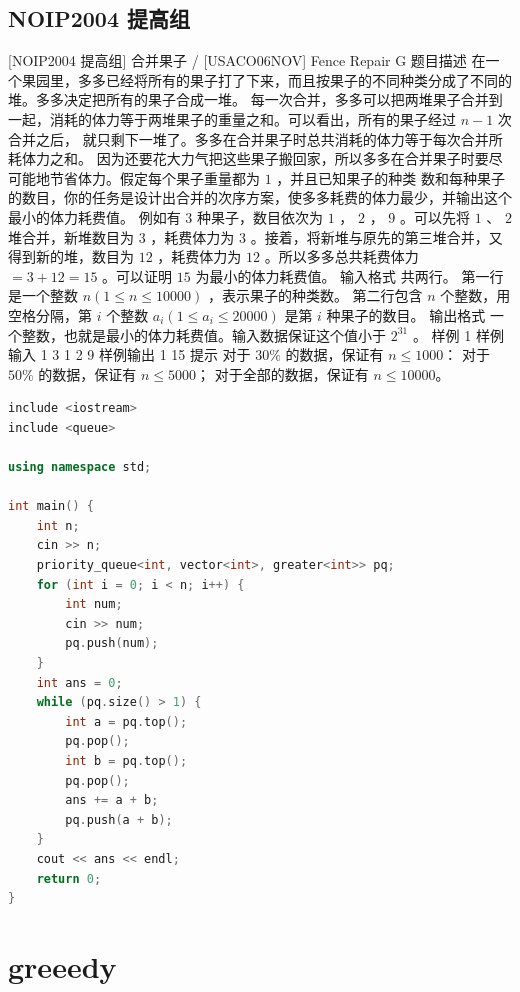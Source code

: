 \documentclass[12pt,twiside,a4paper]{ctexbook}
\numberwithin{chapter}{part}
\begin{document}
\section{NOIP2004 提高组}
 [NOIP2004 提高组] 合并果子 / [USACO06NOV] Fence Repair G
 题目描述
在一个果园里，多多已经将所有的果子打了下来，而且按果子的不同种类分成了不同的堆。多多决定把所有的果子合成一堆。
每一次合并，多多可以把两堆果子合并到一起，消耗的体力等于两堆果子的重量之和。可以看出，所有的果子经过 $n-1$ 次合并之后， 就只剩下一堆了。多多在合并果子时总共消耗的体力等于每次合并所耗体力之和。
因为还要花大力气把这些果子搬回家，所以多多在合并果子时要尽可能地节省体力。假定每个果子重量都为 $1$ ，并且已知果子的种类 数和每种果子的数目，你的任务是设计出合并的次序方案，使多多耗费的体力最少，并输出这个最小的体力耗费值。
例如有 $3$ 种果子，数目依次为 $1$ ， $2$ ， $9$ 。可以先将 $1$ 、 $2$ 堆合并，新堆数目为 $3$ ，耗费体力为 $3$ 。接着，将新堆与原先的第三堆合并，又得到新的堆，数目为 $12$ ，耗费体力为 $12$ 。所以多多总共耗费体力 $=3+12=15$ 。可以证明 $15$ 为最小的体力耗费值。
 输入格式
共两行。  
第一行是一个整数 $n(1\leq n\leq 10000)$ ，表示果子的种类数。  
第二行包含 $n$ 个整数，用空格分隔，第 $i$ 个整数 $a_i(1\leq a_i\leq 20000)$ 是第 $i$ 种果子的数目。
 输出格式
一个整数，也就是最小的体力耗费值。输入数据保证这个值小于 $2^{31}$ 。
 样例 1
 样例输入 1
3 
1 2 9
 样例输出 1
15
 提示
对于 $30\%$ 的数据，保证有 $n \le 1000$：
对于 $50\%$ 的数据，保证有 $n \le 5000$；
对于全部的数据，保证有 $n \le 10000$。
\begin{lstlisting}[language=c++,breaklines=true]
include <iostream>
include <queue>

using namespace std;

int main() {
    int n;
    cin >> n;
    priority_queue<int, vector<int>, greater<int>> pq;
    for (int i = 0; i < n; i++) {
        int num;
        cin >> num;
        pq.push(num);
    }
    int ans = 0;
    while (pq.size() > 1) {
        int a = pq.top();
        pq.pop();
        int b = pq.top();
        pq.pop();
        ans += a + b;
        pq.push(a + b);
    }
    cout << ans << endl;
    return 0;
}
\end{lstlisting}

\chapter{greeedy}
\end{document}
